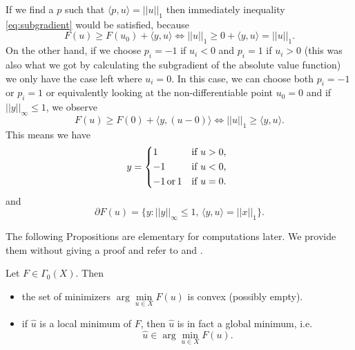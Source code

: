 \begin{example}
\begin{enumerate}
             If we find a $p$ such that $\langle p, u \rangle = ||u||_{1}$ then immediately inequality \ref{eq:subgradient} would be satisfied, because
                $$
                    F(u) \ge F(u_{0}) + \langle y, u \rangle \Longleftrightarrow ||u||_{1} \ge 0 + \langle y, u \rangle = ||u||_{1}.
                $$
            On the other hand, if we choose $p_{i} = -1$ if $u_{i} < 0$ and $p_{i} = 1$ if $u_{i} > 0$ (this was also what we got by calculating the subgradient of the absolute value function) we only have the case left where $u_{i} = 0$. In this case, we can choose both $p_{i} = -1$ or $p_{i} = 1$ or equivalently looking at the non-differentiable point $u_{0} = 0$ and if $||y||_{\infty} \le 1$, we observe
                $$
                    F(u) \ge F(0) + \langle y,  (u - 0) \rangle \Longleftrightarrow ||u||_{1} \ge \langle y, u \rangle.
                $$
            This means we have
                $$
                    y =
                        \begin{dcases*}
                            1 & \textnormal{if $u > 0$,} \\
                            -1 & \textnormal{if $u < 0$,} \\
                            -1 \,\textnormal{or}\, 1 & \textnormal{if $u = 0$.}
                        \end{dcases*}
                $$
            and
                \begin{equation}
                    \partial F(u) = \big\{ y : ||y||_{\infty} \le 1, \, \langle y, u \rangle = ||x||_{1} \big\}.
                    \label{eq:subdifferential_of_l1_norm}
                \end{equation}
        \end{enumerate}
    \end{example}

    The following Propositions are elementary for computations later. We provide them without giving a proof and refer to \cite{Rockafellar} and \cite{Chambolle-et-al-10}.

    \begin{proposition} %

        Let $F \in \Gamma_{0}(X)$. Then

        \begin{itemize}
            \item the set of minimizers $\arg \min\limits_{u \in X} F(u)$ is convex (possibly empty).
            \item if $\hat{u}$ is a local minimum of $F$, then $\hat{u}$ is in fact a global minimum, i.e.
                $$
                    \hat{u} \in \arg \min_{u \in X} F(u).
                $$
        \end{itemize}

    \end{proposition}

